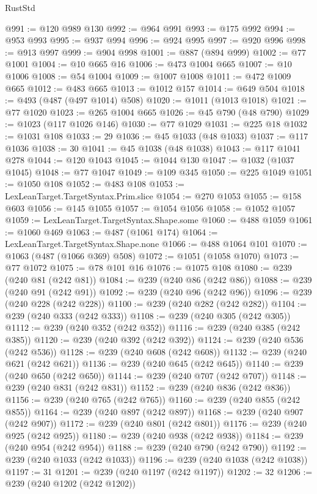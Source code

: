 \begin{lexlean}{RustStd}
\begin{coremodule}
@991 := @120 @989 @130
@992 := @964 @991
@993 := @175 @992
@994 := @953 @993
@995 := @937 @994
@996 := @924 @995
@997 := @920 @996
@998 := @913 @997
@999 := @904 @998
@1001 := @887 (@894 @999)
@1002 := @77 @1001
@1004 := @10 @665 @16
@1006 := @473 @1004 @665
@1007 := @10 @1006
@1008 := @54 @1004
@1009 := @1007 @1008
@1011 := @472 @1009 @665
@1012 := @483 @665
@1013 := @1012 @157
@1014 := @649 @504
@1018 := @493 (@487 (@497 @1014) @508)
@1020 := @1011 (@1013 @1018)
@1021 := @77 @1020
@1023 := @265 @1004 @665
@1026 := @45 @790 (@48 @790)
@1029 := @1023 (@117 @1026 @146)
@1030 := @77 @1029
@1031 := @225 @18
@1032 := @1031 @108
@1033 := 29
@1036 := @45 @1033 (@48 @1033)
@1037 := @117 @1036
@1038 := 30
@1041 := @45 @1038 (@48 @1038)
@1043 := @117 @1041 @278
@1044 := @120 @1043
@1045 := @1044 @130
@1047 := @1032 (@1037 @1045)
@1048 := @77 @1047
@1049 := @109 @345
@1050 := @225 @1049
@1051 := @1050 @108
@1052 := @483 @108
@1053 := LexLeanTarget.TargetSyntax.Prim.slice
@1054 := @270 @1053
@1055 := @158 @603
@1056 := @145 @1055
@1057 := @1054 @1056
@1058 := @1052 @1057
@1059 := LexLeanTarget.TargetSyntax.Shape.some
@1060 := @488 @1059
@1061 := @1060 @469
@1063 := @487 (@1061 @174)
@1064 := LexLeanTarget.TargetSyntax.Shape.none
@1066 := @488 @1064 @101
@1070 := @1063 (@487 (@1066 @369) @508)
@1072 := @1051 (@1058 @1070)
@1073 := @77 @1072
@1075 := @78 @101 @16
@1076 := @1075 @108
@1080 := @239 (@240 @81 (@242 @81))
@1084 := @239 (@240 @86 (@242 @86))
@1088 := @239 (@240 @91 (@242 @91))
@1092 := @239 (@240 @96 (@242 @96))
@1096 := @239 (@240 @228 (@242 @228))
@1100 := @239 (@240 @282 (@242 @282))
@1104 := @239 (@240 @333 (@242 @333))
@1108 := @239 (@240 @305 (@242 @305))
@1112 := @239 (@240 @352 (@242 @352))
@1116 := @239 (@240 @385 (@242 @385))
@1120 := @239 (@240 @392 (@242 @392))
@1124 := @239 (@240 @536 (@242 @536))
@1128 := @239 (@240 @608 (@242 @608))
@1132 := @239 (@240 @621 (@242 @621))
@1136 := @239 (@240 @645 (@242 @645))
@1140 := @239 (@240 @650 (@242 @650))
@1144 := @239 (@240 @707 (@242 @707))
@1148 := @239 (@240 @831 (@242 @831))
@1152 := @239 (@240 @836 (@242 @836))
@1156 := @239 (@240 @765 (@242 @765))
@1160 := @239 (@240 @855 (@242 @855))
@1164 := @239 (@240 @897 (@242 @897))
@1168 := @239 (@240 @907 (@242 @907))
@1172 := @239 (@240 @801 (@242 @801))
@1176 := @239 (@240 @925 (@242 @925))
@1180 := @239 (@240 @938 (@242 @938))
@1184 := @239 (@240 @954 (@242 @954))
@1188 := @239 (@240 @790 (@242 @790))
@1192 := @239 (@240 @1033 (@242 @1033))
@1196 := @239 (@240 @1038 (@242 @1038))
@1197 := 31
@1201 := @239 (@240 @1197 (@242 @1197))
@1202 := 32
@1206 := @239 (@240 @1202 (@242 @1202))

\end{coremodule}
\end{lexlean}
